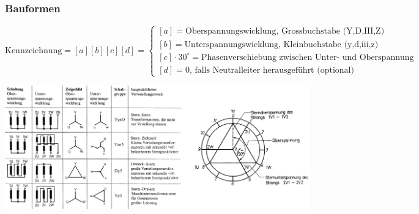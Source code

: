  	\subsubsection{Bauformen}
	 $$\text{Kennzeichnung} = [a][b][c][d] = \begin{cases}
                  [a] = \text{Oberspannungswicklung, Grossbuchstabe (Y,D,III,Z)
                  }\\
                  [b] = \text{Unterspannungswicklung, Kleinbuchstabe (y,d,iii,z) } \\
                  [c] \cdot 30^\circ = \text{Phasenverschiebung zwischen Unter- und Oberspannung }
                  \\ [d] = 0 \text{, falls Neutralleiter herausgeführt (optional)}
                  \end{cases}$$
		\begin{center}
	    	\includegraphics[width=0.99\textwidth]{bilder/Drehstromtrafo.png}
	    \end{center} 
	    

